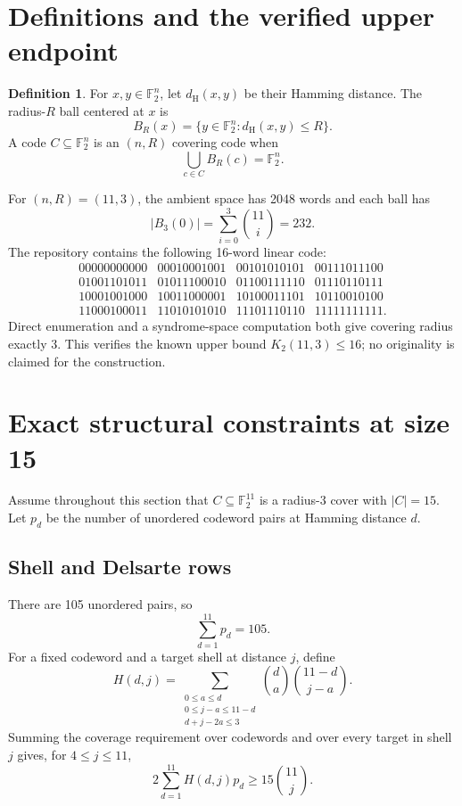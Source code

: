 \documentclass[11pt]{article}
\theoremstyle{definition}
\newtheorem{definition}[theorem]{Definition}
\theoremstyle{remark}
\newcommand{\F}{\mathbb F}
\newcommand{\dist}{d_{\mathrm H}}
\begin{document}
\section{Definitions and the verified upper endpoint}

\begin{definition}
For $x,y\in\F_2^n$, let $\dist(x,y)$ be their Hamming distance.  The
radius-$R$ ball centered at $x$ is
\[
  B_R(x)=\{y\in\F_2^n:\dist(x,y)\leq R\}.
\]
A code $C\subseteq\F_2^n$ is an $(n,R)$ covering code when
\[
  \bigcup_{c\in C} B_R(c)=\F_2^n.
\]
\end{definition}

For $(n,R)=(11,3)$, the ambient space has 2048 words and each ball has
\[
  |B_3(0)|=\sum_{i=0}^{3}\binom{11}{i}=232.
\]
The repository contains the following 16-word linear code:
\[
\begin{array}{llll}
00000000000 & 00010001001 & 00101010101 & 00111011100\\
01001101011 & 01011100010 & 01100111110 & 01110110111\\
10001001000 & 10011000001 & 10100011101 & 10110010100\\
11000100011 & 11010101010 & 11101110110 & 11111111111.
\end{array}
\]
Direct enumeration and a syndrome-space computation both give covering
radius exactly 3.  This verifies the known upper bound
$K_2(11,3)\leq16$; no originality is claimed for the construction.

\section{Exact structural constraints at size 15}

Assume throughout this section that $C\subseteq\F_2^{11}$ is a
radius-3 cover with $|C|=15$.  Let $p_d$ be the number of unordered
codeword pairs at Hamming distance $d$.

\subsection{Shell and Delsarte rows}

There are 105 unordered pairs, so
\[
  \sum_{d=1}^{11}p_d=105.
\]
For a fixed codeword and a target shell at distance $j$, define
\[
  H(d,j)=
  \sum_{\substack{0\leq a\leq d\\
                  0\leq j-a\leq 11-d\\
                  d+j-2a\leq3}}
    \binom da\binom{11-d}{j-a}.
\]
Summing the coverage requirement over codewords and over every target
in shell $j$ gives, for $4\leq j\leq11$,
\[
  2\sum_{d=1}^{11}H(d,j)p_d
  \geq15\binom{11}{j}.
\]
\end{document}
